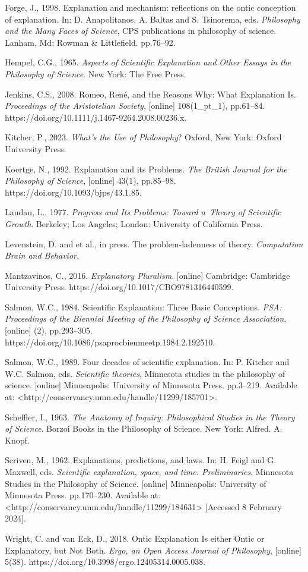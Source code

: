 Forge, J., 1998. Explanation and mechanism: reflections on the ontic conception of explanation. In: D. Anapolitanos, A. Baltas and S. Tsinorema, eds. \textit{Philosophy and the Many Faces of Science}, CPS publications in philosophy of science. Lanham, Md: Rowman \& Littlefield. pp.76–92.

Hempel, C.G., 1965. \textit{Aspects of Scientific Explanation and Other Essays in the Philosophy of Science}. New York: The Free Press.

Jenkins, C.S., 2008. Romeo, René, and the Reasons Why: What Explanation Is. \textit{Proceedings of the Aristotelian Society}, [online] 108(1\_pt\_1), pp.61–84. https://doi.org/10.1111/j.1467-9264.2008.00236.x.

Kitcher, P., 2023. \textit{What's the Use of Philosophy}? Oxford, New York: Oxford University Press.

Koertge, N., 1992. Explanation and its Problems. \textit{The British Journal for the Philosophy of Science}, [online] 43(1), pp.85–98. https://doi.org/10.1093/bjps/43.1.85.

Laudan, L., 1977. \textit{Progress and Its Problems: Toward a~Theory of Scientific Growth}. Berkeley; Los Angeles; London: University of California Press.

Levenstein, D. and et al., in press. The problem-ladenness of theory. \textit{Computation Brain and Behavior}.

Mantzavinos, C., 2016. \textit{Explanatory Pluralism}. [online] Cambridge: Cambridge University Press. https://doi.org/10.1017/CBO9781316440599.

Salmon, W.C., 1984. Scientific Explanation: Three Basic Conceptions. \textit{PSA: Proceedings of the Biennial Meeting of the Philosophy of Science Association}, [online] (2), pp.293–305. https://doi.org/10.1086/psaprocbienmeetp.1984.2.192510.

Salmon, W.C., 1989. Four decades of scientific explanation. In: P. Kitcher and W.C. Salmon, eds. \textit{Scientific theories}, Minnesota studies in the philosophy of science. [online] Minneapolis: University of Minnesota Press. pp.3–219. Available at: {\textless}http://conservancy.umn.edu/handle/11299/185701{\textgreater}.

Scheffler, I., 1963. \textit{The Anatomy of Inquiry: Philosophical Studies in the Theory of Science}. Borzoi Books in the Philosophy of Science. New York: Alfred. A. Knopf.

Scriven, M., 1962. Explanations, predictions, and laws. In: H. Feigl and G. Maxwell, eds. \textit{Scientific explanation, space, and time. Preliminaries}, Minnesota Studies in the Philosophy of Science. [online] Minneapolis: University of Minnesota Press. pp.170–230. Available at: {\textless}http://conservancy.umn.edu/handle/11299/184631{\textgreater} [Accessed 8 February 2024].

Wright, C. and van Eck, D., 2018. Ontic Explanation Is either Ontic or Explanatory, but Not Both. \textit{Ergo, an Open Access Journal of Philosophy}, [online] 5(38). https://doi.org/10.3998/ergo.12405314.0005.038.

